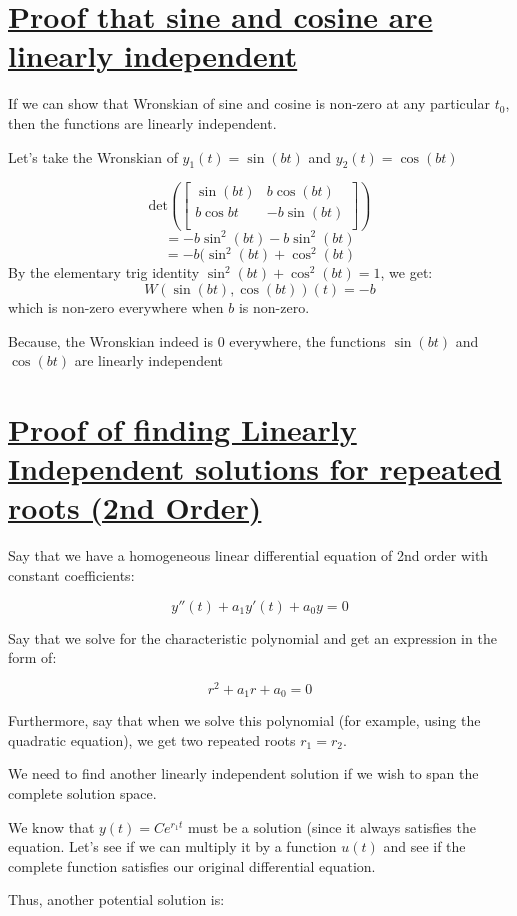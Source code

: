 \documentclass{report}
\begin{document}
\section{\hyperref[sinLin]{Proof that sine and cosine are linearly independent}}
\label{sec:prSinLin}
If we can show that Wronskian of sine and cosine is non-zero at any particular $t_0$, then the functions are linearly independent.

Let's take the Wronskian of $y_1(t) = \sin(bt)$ and $y_2(t) = \cos(bt)$

$$
    \text{det}\left(\begin{bmatrix}
        \sin(bt) & b\cos(bt)\\
        b\cos{bt} & -b\sin(bt) \\
    \end{bmatrix}\right)
$$
$$=-b\sin^2(bt)-b\sin^2(bt)$$
$$=-b(\sin^2(bt) + \cos^2(bt)$$
By the elementary trig identity $\sin^2(bt) + \cos^2(bt) = 1$, we get:
$$W(\sin(bt),\cos(bt))(t)=-b$$
which is non-zero everywhere when $b$ is non-zero.

Because, the Wronskian indeed is 0 everywhere, the functions $\sin(bt)$ and $\cos(bt)$ are linearly independent


\section{\hyperref[repRoot]{Proof of finding Linearly Independent solutions for repeated roots (2nd Order)}}
\label{sec:PrRepRoot}
Say that we have a homogeneous linear differential equation of 2nd order with constant coefficients:

$$y''(t) + a_1y'(t) + a_0y = 0$$

Say that we solve for the characteristic polynomial and get an expression in the form of:

$$r^2 + a_1r + a_0 = 0$$

Furthermore, say that when we solve this polynomial (for example, using the quadratic equation), we get two repeated roots $r_1=r_2$.

We need to find another linearly independent solution if we wish to span the complete solution space.

We know that $y(t) = Ce^{r_1t}$ must be a solution (since it always satisfies the equation. Let's see if we can multiply it by a function $u(t)$ and see if the complete function satisfies our original differential equation.

Thus, another potential solution is:
\end{document}
